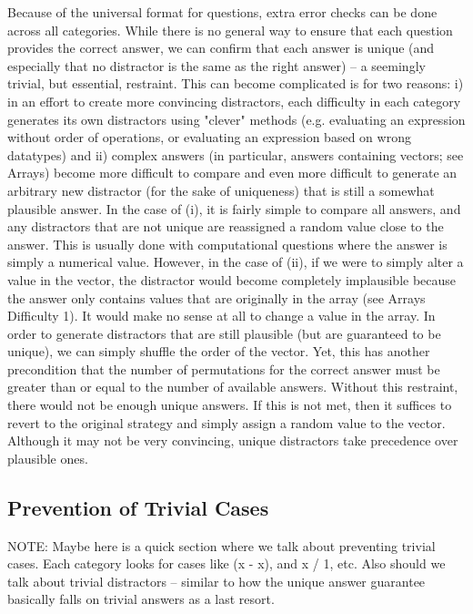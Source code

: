 \documentclass{article}
\begin{document}
Because of the universal format for questions, extra error checks can be done across all categories. While there is no general way
to ensure that each question provides the correct answer, we can confirm that each answer is unique
(and especially that no distractor is the same as the right answer) -- a seemingly trivial, but essential, restraint.
This can become complicated is for two reasons: i) in an effort to create more convincing distractors,
each difficulty in each category generates its own distractors using "clever" methods (e.g. evaluating an expression
without order of operations, or evaluating an expression based on wrong datatypes) and ii) complex answers
(in particular, answers containing vectors; see Arrays) become more difficult to compare and even more difficult
to generate an arbitrary new distractor (for the sake of uniqueness) that is still a somewhat plausible answer.
In the case of (i), it is fairly simple to compare all answers, and any distractors that are not unique are reassigned
a random value close to the answer. This is usually done with computational questions where the answer is simply a
numerical value. However, in the case of (ii), if we were to simply alter a value in the vector, the distractor would
become completely implausible because the answer only contains values that are originally in the array (see Arrays
Difficulty 1). It would make no sense at all to change a value in the array. In order to generate distractors that
are still plausible (but are guaranteed to be unique), we can simply shuffle the order of the vector. Yet, this has
another precondition that the number of permutations for the correct answer must be greater than or equal to the
number of available answers. Without this restraint, there would not be enough unique answers. If this is not met,
then it suffices to revert to the original strategy and simply assign a random value to the vector. Although it may
not be very convincing, unique distractors take precedence over plausible ones.

\subsection{Prevention of Trivial Cases}

NOTE: Maybe here is a quick section where we talk about preventing trivial cases. Each category looks for cases like (x - x), and x / 1, etc. Also should we talk about trivial distractors -- similar to how the unique answer guarantee basically falls on trivial answers as a last resort.
\end{document}
